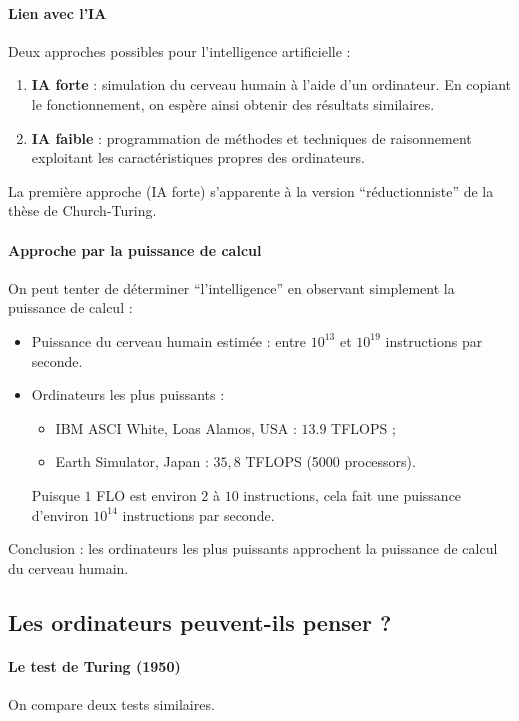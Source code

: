 \paragraph{Lien avec l'IA}
Deux approches possibles pour l'intelligence artificielle :
\begin{enumerate}
	\item \textbf{IA forte} : simulation du cerveau humain à l'aide d'un ordinateur. En copiant le fonctionnement, on espère ainsi obtenir des résultats similaires.
	\item \textbf{IA faible} : programmation de méthodes et techniques de raisonnement exploitant les caractéristiques propres des ordinateurs.
\end{enumerate}
La première approche (IA forte) s'apparente à la version ``réductionniste'' de la thèse de Church-Turing.


\paragraph{Approche par la puissance de calcul}
On peut tenter de déterminer ``l'intelligence'' en observant simplement la puissance de calcul :
\begin{itemize}
	\item Puissance du cerveau humain estimée : entre $10^{13}$ et $10^{19}$ instructions par seconde.
	\item Ordinateurs les plus puissants :
	\begin{itemize}
	\item IBM ASCI White, Loas Alamos, USA : $13.9$ TFLOPS ;
	\item Earth Simulator, Japan : $35,8$ TFLOPS (5000 processors).
\end{itemize}
Puisque $1$ FLO est environ $2$ à $10$ instructions, cela fait une puissance d'environ $10^{14}$ instructions par seconde.
\end{itemize}
Conclusion : les ordinateurs les plus puissants approchent la puissance de calcul du cerveau humain.

\subsection{Les ordinateurs peuvent-ils penser ?}
\paragraph{Le test de Turing (1950)}
On compare deux tests similaires.\\

